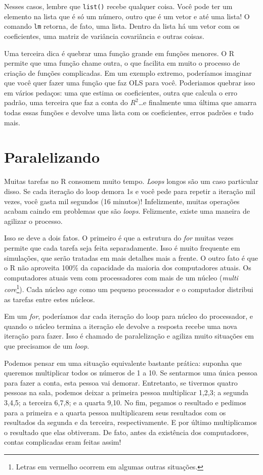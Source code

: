 \documentclass[
]{book}
\begin{document}
Nesses casos, lembre que \texttt{list()} recebe qualquer coisa. Você pode ter um elemento na lista que é só um número, outro que é um vetor e até uma lista! O comando \texttt{lm} retorna, de fato, uma lista. Dentro da lista há um vetor com os coeficientes, uma matriz de variância covariância e outras coisas.

Uma terceira dica é quebrar uma função grande em funções menores. O R permite que uma função chame outra, o que facilita em muito o processo de criação de funções complicadas. Em um exemplo extremo, poderíamos imaginar que você quer fazer uma função que faz OLS para você. Poderiamos quebrar isso em vários pedaços: uma que estima os coeficientes, outra que calcula o erro padrão, uma terceira que faz a conta do \(R^2\)\ldots e finalmente uma última que amarra todas essas funções e devolve uma lista com os coeficientes, erros padrões e tudo mais.

\hypertarget{paralelizando}{%
\chapter{Paralelizando}\label{paralelizando}}

Muitas tarefas no R consomem muito tempo. \emph{Loops} longos são um caso particular disso. Se cada iteração do loop demora 1s e você pede para repetir a iteração mil vezes, você gasta mil segundos (16 minutos)! Infelizmente, muitas operações acabam caindo em problemas que são \emph{loops}. Felizmente, existe uma maneira de agilizar o processo.

Isso se deve a dois fatos. O primeiro é que a estrutura do \emph{for} muitas vezes permite que cada tarefa seja feita separadamente. Isso é muito frequente em simulações, que serão tratadas em mais detalhes mais a frente. O outro fato é que o R não aproveita 100\% da capacidade da maioria dos computadores atuais. Os computadores atuais vem com processadores com mais de um núcleo (\emph{multi core}\footnote{Letras em vermelho ocorrem em algumas outras situações.}). Cada núcleo age como um pequeno processador e o computador distribui as tarefas entre estes núcleos.

Em um \emph{for}, poderíamos dar cada iteração do loop para núcleo do processador, e quando o núcleo termina a iteração ele devolve a resposta recebe uma nova iteração para fazer. Isso é chamado de paralelização e agiliza muito situações em que precisamos de um \emph{loop}.

Podemos pensar em uma situação equivalente bastante prática: suponha que queremos multiplicar todos os números de 1 a 10. Se sentarmos uma única pessoa para fazer a conta, esta pessoa vai demorar. Entretanto, se tivermos quatro pessoas na sala, podemos deixar a primeira pessoa multiplicar 1,2,3; a segunda 3,4,5; a terceira 6,7,8; e a quarta 9,10. No fim, pegamos o resultado e pedimos para a primeira e a quarta pessoa multiplicarem seus resultados com os resultados da segunda e da terceira, respectivamente. E por último multiplicamos o resultado que elas obtiveram. De fato, antes da existência dos computadores, contas complicadas eram feitas assim!
\end{document}
